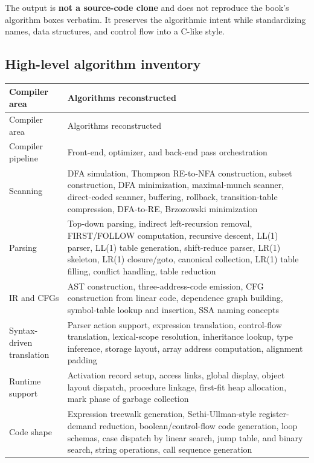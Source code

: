 \documentclass[10pt,letterpaper]{article}
\begin{document}
The output is \textbf{not a source-code clone} and does not reproduce the book's algorithm boxes verbatim. It preserves the algorithmic intent while standardizing names, data structures, and control flow into a C-like style.

\subsection*{High-level algorithm inventory}

\begin{longtable}{L{0.27\textwidth}L{0.66\textwidth}}
\toprule
Compiler area & Algorithms reconstructed \\
\midrule\endfirsthead
\toprule
Compiler area & Algorithms reconstructed \\
\midrule\endhead
Compiler pipeline & Front-end, optimizer, and back-end pass orchestration \\
Scanning & DFA simulation, Thompson RE-to-NFA construction, subset construction, DFA minimization, maximal-munch scanner, direct-coded scanner, buffering, rollback, transition-table compression, DFA-to-RE, Brzozowski minimization \\
Parsing & Top-down parsing, indirect left-recursion removal, FIRST/FOLLOW computation, recursive descent, LL(1) parser, LL(1) table generation, shift-reduce parser, LR(1) skeleton, LR(1) closure/goto, canonical collection, LR(1) table filling, conflict handling, table reduction \\
IR and CFGs & AST construction, three-address-code emission, CFG construction from linear code, dependence graph building, symbol-table lookup and insertion, SSA naming concepts \\
Syntax-driven translation & Parser action support, expression translation, control-flow translation, lexical-scope resolution, inheritance lookup, type inference, storage layout, array address computation, alignment padding \\
Runtime support & Activation record setup, access links, global display, object layout dispatch, procedure linkage, first-fit heap allocation, mark phase of garbage collection \\
Code shape & Expression treewalk generation, Sethi-Ullman-style register-demand reduction, boolean/control-flow code generation, loop schemas, case dispatch by linear search, jump table, and binary search, string operations, call sequence generation \\

\end{longtable}
\end{document}
